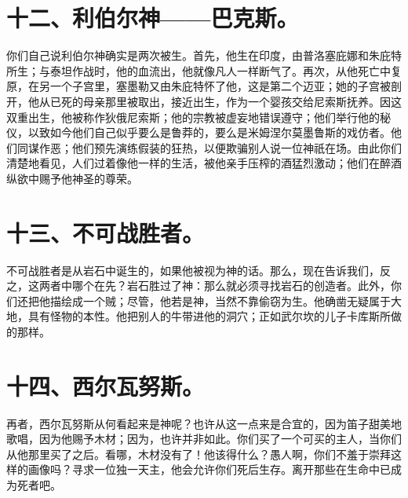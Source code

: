 
\section{十二、利伯尔神——巴克斯。}

你们自己说利伯尔神确实是两次被生。首先，他生在印度，由普洛塞庇娜和朱庇特所生；与泰坦作战时，他的血流出，他就像凡人一样断气了。再次，从他死亡中复原，在另一个子宫里，塞墨勒又由朱庇特怀了他，这是第二个迈亚；她的子宫被剖开，他从已死的母亲那里被取出，接近出生，作为一个婴孩交给尼索斯抚养。因这双重出生，他被称作狄俄尼索斯；他的宗教被虚妄地错误遵守；他们举行他的秘仪，以致如今他们自己似乎要么是鲁莽的，要么是米姆涅尔莫墨鲁斯的戏仿者。他们同谋作恶；他们预先演练假装的狂热，以便欺骗别人说一位神祇在场。由此你们清楚地看见，人们过着像他一样的生活，被他亲手压榨的酒猛烈激动；他们在醉酒纵欲中赐予他神圣的尊荣。\par


\section{十三、不可战胜者。}

不可战胜者是从岩石中诞生的，如果他被视为神的话。那么，现在告诉我们，反之，这两者中哪个在先？岩石胜过了神：那么就必须寻找岩石的创造者。此外，你们还把他描绘成一个贼；尽管，他若是神，当然不靠偷窃为生。他确凿无疑属于大地，具有怪物的本性。他把别人的牛带进他的洞穴；正如武尔坎的儿子卡库斯所做的那样。\par


\section{十四、西尔瓦努斯。}

再者，西尔瓦努斯从何看起来是神呢？也许从这一点来是合宜的，因为笛子甜美地歌唱，因为他赐予木材；因为，也许并非如此。你们买了一个可买的主人，当你们从他那里买了之后。看哪，木材没有了！他该得什么？愚人啊，你们不羞于崇拜这样的画像吗？寻求一位独一天主，他会允许你们死后生存。离开那些在生命中已成为死者吧。\par


